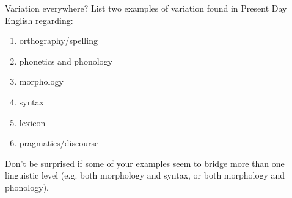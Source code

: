 \begin{exercises}{Variation everywhere?}
List two examples of variation found in Present Day English regarding:
\begin{enumerate}
      \item orthography/spelling
      \item phonetics and phonology
      \item morphology
      \item syntax
      \item lexicon
      \item pragmatics/discourse
\end{enumerate}

\noindent Don't be surprised if some of your examples seem to bridge more than one linguistic level (e.g. both morphology and syntax, or both morphology and phonology).

\end{exercises}


